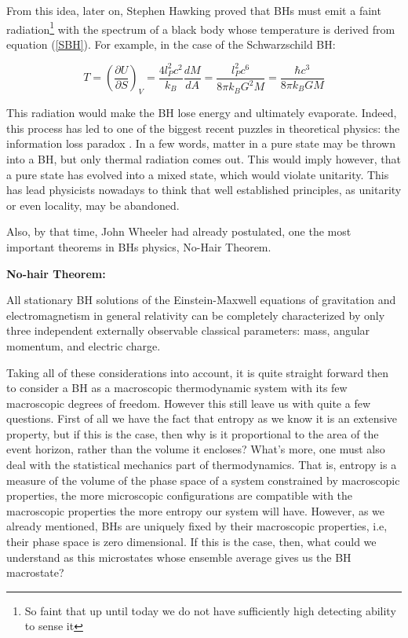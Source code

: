 \documentclass[11pt,a4paper]{article}
\begin{document}
From this idea, later on, Stephen Hawking \cite{Hawking:1975vcx} proved that BHs must emit a faint radiation\footnote{So faint that up until today we do not have sufficiently high detecting ability to sense it} with the spectrum of a black body whose temperature is derived from equation (\ref{SBH}). For example, in the case of the Schwarzschild BH:

\begin{equation}
	T = \left(\frac{\partial U}{\partial S}\right)_V = \frac{4l_P^2c^2}{k_B}\frac{dM}{dA} = \frac{l_P^2c^6}{8\pi k_BG^2M} = \frac{\hbar c^3}{8\pi k_B GM}
\end{equation}

This radiation would make the BH lose energy and ultimately evaporate. Indeed, this process has led to one of the biggest recent puzzles in theoretical physics: the information loss paradox \cite{Hawking:1976ra}. In a few words, matter in a pure state may be thrown into a BH, but only thermal radiation comes out. This would imply however, that a pure state has evolved into a mixed state, which would violate unitarity. This has lead physicists nowadays to think that well established principles, as unitarity or even locality, may be abandoned.

Also, by that time, John Wheeler had already postulated, one the most important theorems in BHs physics, No-Hair Theorem.

\begin{boxedminipage}{0.9\textwidth}
    \textbf{No-hair Theorem: }
    
    All stationary BH solutions of the Einstein-Maxwell equations of gravitation and electromagnetism in general relativity can be completely characterized by only three independent externally observable classical parameters: mass, angular momentum, and electric charge.
\end{boxedminipage}

Taking all of these considerations into account, it is quite straight forward then to consider a BH as a macroscopic thermodynamic system with its few macroscopic degrees of freedom. However this still leave us with quite a few questions. First of all we have the fact that entropy as we know it is an extensive property, but if this is the case, then why is it proportional to the area of the event horizon, rather than the volume it encloses? What's more, one must also deal with the statistical mechanics part of thermodynamics. That is, entropy is a measure of the volume of the phase space of a system constrained by macroscopic properties, the more microscopic configurations are compatible with the macroscopic properties the more entropy our system will have. However, as we already mentioned, BHs are uniquely fixed by their macroscopic properties, i.e, their phase space is zero dimensional. If this is the case, then, what could we understand as this microstates whose ensemble average gives us the BH macrostate?
\end{document}
